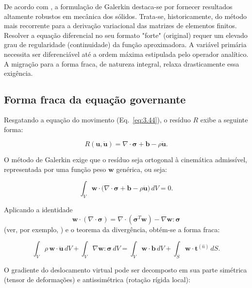 \indent De acordo com \citet{rao2017finite}, a formulação de Galerkin destaca-se por fornecer resultados altamente robustos em mecânica dos sólidos. Trata-se, historicamente, do método mais recorrente para a derivação variacional das matrizes de elementos finitos. \\
\indent Resolver a equação diferencial no seu formato "forte" (original) requer um elevado grau de regularidade (continuidade) da função aproximadora. A variável primária necessita ser diferenciável até a ordem máxima estipulada pelo operador analítico. A migração para a forma fraca, de natureza integral, relaxa drasticamente essa exigência. 

\subsection{Forma fraca da equação governante}

\indent Resgatando a equação do movimento (Eq.~\ref{eq:3.44}), o resíduo $R$ exibe a seguinte forma: 

\begin{equation}
    R(\mathbf{u}, \ddot{\mathbf{u}}) = \nabla \cdot \boldsymbol{\sigma}  +  \mathbf{b}  -  \rho \ddot{\mathbf{u}}.
    \label{eq:3.52}
\end{equation}


\indent O método de Galerkin exige que o resíduo seja ortogonal à cinemática admissível, representada por uma função peso $\mathbf{w}$ genérica, ou seja: 

\begin{equation}
    \int_{V} \mathbf{w} \cdot \bigl( \nabla \cdot \boldsymbol{\sigma}  +  \mathbf{b}  -  \rho \ddot{\mathbf{u}} \bigr)\, dV = 0.
    \label{eq:3.53}
\end{equation}

\indent Aplicando a identidade $$\mathbf{w} \cdot (\nabla \cdot \boldsymbol{\sigma}) = \nabla \cdot (\boldsymbol{\sigma}^T \mathbf{w}) - \nabla\mathbf{w} : \boldsymbol{\sigma}$$ (ver, por exemplo, \citet{hughes1987finite}) e o teorema da divergência, obtém-se a forma fraca:

\begin{equation}
    \int_{V} \rho \, \mathbf{w} \cdot \ddot{\mathbf{u}} \, dV + \int_{V} \nabla\mathbf{w} : \boldsymbol{\sigma} \, dV  
    = \int_{V} \mathbf{w} \cdot \mathbf{b} \, dV + \int_{S} \mathbf{w} \cdot \mathbf{t}^{(\hat{n})} \, dS.
    \label{eq:3.54}
\end{equation}

\indent O gradiente do deslocamento virtual pode ser decomposto em sua parte simétrica (tensor de deformações) e antissimétrica (rotação rígida local): 

